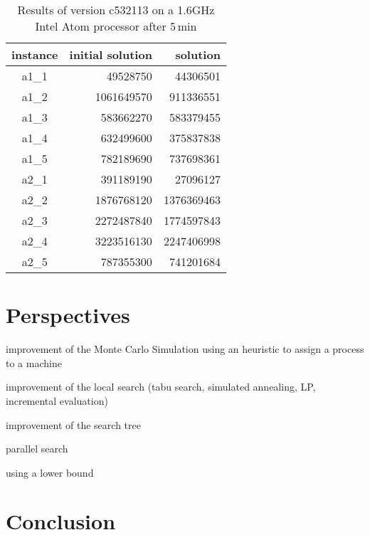 \documentclass[a4paper,twocolumn]{article}
\begin{document}
\begin{table}
  \centering
  \label{tab:results}
  \caption{Results of version c532113 on a 1.6GHz Intel Atom processor
    after 5\,min}
  \begin{tabular}{|c|r|r|}
    \hline
    instance & initial solution & solution\\
    \hline
    a1\_1 &   49528750 &   44306501\\
    a1\_2 & 1061649570 &  911336551\\
    a1\_3 &  583662270 &  583379455\\
    a1\_4 &  632499600 &  375837838\\
    a1\_5 &  782189690 &  737698361\\
    a2\_1 &  391189190 &   27096127\\
    a2\_2 & 1876768120 & 1376369463\\
    a2\_3 & 2272487840 & 1774597843\\
    a2\_4 & 3223516130 & 2247406998\\
    a2\_5 &  787355300 &  741201684\\
    \hline
  \end{tabular}
\end{table}

\section{Perspectives}

improvement of the Monte Carlo Simulation using an heuristic to assign
a process to a machine

improvement of the local search (tabu search, simulated annealing, LP,
incremental evaluation)

improvement of the search tree

parallel search

using a lower bound

\section{Conclusion}



\end{document}
